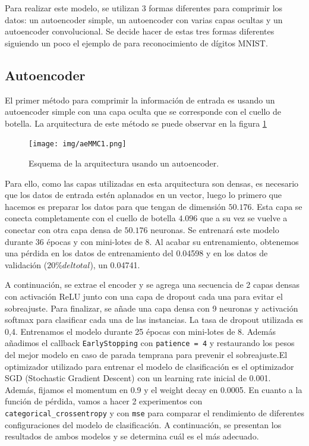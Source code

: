 Para realizar este modelo, se utilizan 3 formas diferentes para comprimir los datos: un autoencoder simple, un autoencoder con varias capas ocultas y un autoencoder convolucional. Se decide hacer de estas tres formas diferentes siguiendo un poco el ejemplo de \citep{aekeras} para reconocimiento de dígitos MNIST. 

\subsection{Autoencoder}

El primer método para comprimir la información de entrada es usando un autoencoder simple con una capa oculta que se corresponde con el cuello de botella. La arquitectura de este método se puede observar en la figura \ref{img: aeMMC}

\begin{figure}[h]
    \begin{center}
    \texttt{[image: img/aeMMC1.png]}
    \end{center}
    \caption{Esquema de la arquitectura usando un autoencoder.}
    \label{img: aeMMC}
\end{figure}

Para ello, como las capas utilizadas en esta arquitectura son densas, es necesario que los datos de entrada estén aplanados en un vector, luego lo primero que hacemos es preparar los datos para que tengan de dimensión $50.176$. Esta capa se conecta completamente con el cuello de botella $4.096$ que a su vez se vuelve a conectar con otra capa densa de $50.176$ neuronas. Se entrenará este modelo durante 36 épocas y con mini-lotes de 8. Al acabar su entrenamiento, obtenemos una pérdida en los datos de entrenamiento del 0.04598 y en los datos de validación ($20\% del total$), un 0.04741. 

A continuación, se extrae el encoder y se agrega una secuencia de 2 capas densas con activación ReLU junto con una capa de dropout cada una para evitar el sobreajuste. Para finalizar, se añade una capa densa con 9 neuronas y activación softmax para clasificar cada una de las instancias. La tasa de dropout utilizada es 0,4. Entrenamos el modelo durante 25 épocas con mini-lotes de 8. Además añadimos el callback \lstinline|EarlyStopping| con \lstinline|patience = 4| y restaurando los pesos del mejor modelo en caso de parada temprana para prevenir el sobreajuste.El optimizador utilizado para entrenar el modelo de clasificación es el optimizador SGD (Stochastic Gradient Descent) con un learning rate inicial de 0.001. Además, fijamos el momentum en 0.9 y el weight decay en 0.0005. En cuanto a la función de pérdida, vamos a hacer 2 experimentos con \lstinline|categorical_crossentropy| y con \lstinline|mse| para comparar el rendimiento de diferentes configuraciones del modelo de clasificación. A continuación, se presentan los resultados de ambos modelos y se determina cuál es el más adecuado.


